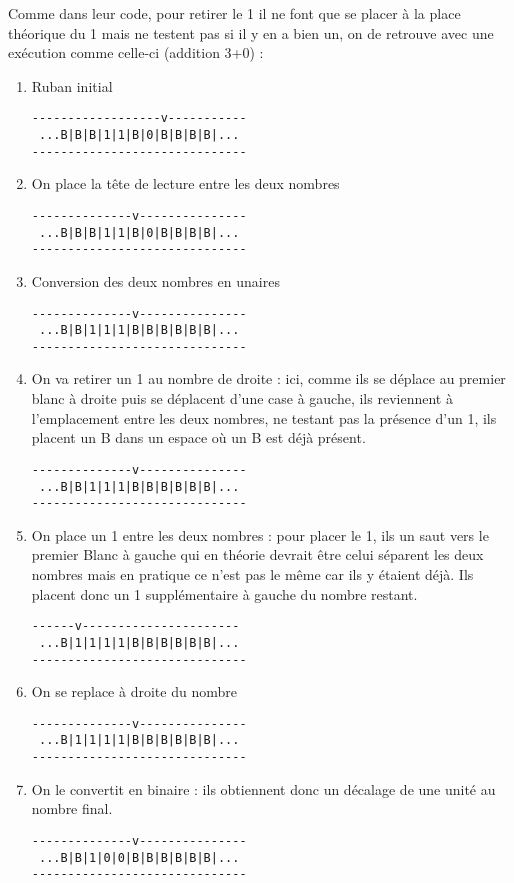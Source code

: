 \documentclass[a4paper,11pt]{article}
\begin{document}
Comme dans leur code, pour retirer le 1 il ne font que se placer à la place théorique du 1 mais ne testent pas si il y en a bien un, on de retrouve avec une exécution comme celle-ci (addition 3+0) :
\begin{enumerate}
\item Ruban initial
\begin{verbatim}
------------------v-----------
 ...B|B|B|1|1|B|0|B|B|B|B|...
------------------------------
\end{verbatim}
\item On place la tête de lecture entre les deux nombres
\begin{verbatim}
--------------v---------------
 ...B|B|B|1|1|B|0|B|B|B|B|...
------------------------------
\end{verbatim}
\item Conversion des deux nombres en unaires
\begin{verbatim}
--------------v---------------
 ...B|B|1|1|1|B|B|B|B|B|B|...
------------------------------
\end{verbatim}
\item On va retirer un 1 au nombre de droite : ici, comme ils se déplace au premier blanc à droite puis se déplacent d'une case à gauche, ils reviennent à l'emplacement entre les deux nombres, ne testant pas la présence d'un 1, ils placent un B dans un espace où un B est déjà présent.
\begin{verbatim}
--------------v---------------
 ...B|B|1|1|1|B|B|B|B|B|B|...
------------------------------
\end{verbatim}
\item On place un 1 entre les deux nombres : pour placer le 1, ils un saut vers le premier Blanc à gauche qui en théorie devrait être celui séparent les deux nombres mais en pratique ce n'est pas le même car ils y étaient déjà. Ils placent donc un 1 supplémentaire à gauche du nombre restant.
\begin{verbatim}
------v----------------------
 ...B|1|1|1|1|B|B|B|B|B|B|...
------------------------------
\end{verbatim}
\item On se replace à droite du nombre
\begin{verbatim}
--------------v---------------
 ...B|1|1|1|1|B|B|B|B|B|B|...
------------------------------
\end{verbatim}
\item On le convertit en binaire : ils obtiennent donc un décalage de une unité au nombre final.
\begin{verbatim}
--------------v---------------
 ...B|B|1|0|0|B|B|B|B|B|B|...
------------------------------
\end{verbatim}
\end{enumerate}
\end{document}
